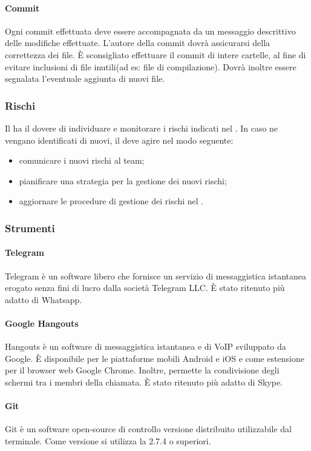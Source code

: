  \paragraph{Commit}
 Ogni commit effettuata deve essere accompagnata da un messaggio descrittivo delle modifiche effettuate. L'autore della commit dovrà assicurarsi della correttezza dei file. È sconsigliato effettuare il commit di intere cartelle, al fine di evitare inclusioni di file inutili(ad es: file di compilazione).
 Dovrà inoltre essere segnalata l'eventuale aggiunta di nuovi file.
 \subsubsection{Rischi}
 Il \RESP{} ha il dovere di individuare e monitorare i rischi indicati nel \PPdoc. In caso ne vengano identificati di nuovi, il \RESP{} deve agire nel modo seguente:
 \begin{itemize}
  \item comunicare i nuovi rischi al team;
  \item pianificare una strategia per la gestione dei nuovi rischi;
  \item aggiornare le procedure di gestione dei rischi nel \PPdoc.
 \end{itemize}
\subsubsection{Strumenti}
 \paragraph{Telegram}
 Telegram è un software libero che fornisce un servizio di messaggistica istantanea erogato senza fini di lucro dalla società Telegram LLC. È stato ritenuto più adatto di Whatsapp.
 \paragraph{Google Hangouts}
 Hangouts è un software di messaggistica istantanea e di VoIP   sviluppato da Google. È disponibile per le piattaforme mobili Android e iOS e come estensione per il browser web Google Chrome. Inoltre, permette la condivisione degli schermi tra i membri della chiamata. È stato ritenuto più adatto di Skype.
 \paragraph{Git}
 Git è un software open-source di controllo versione distribuito utilizzabile dal terminale. Come versione si utilizza la 2.7.4 o superiori.
